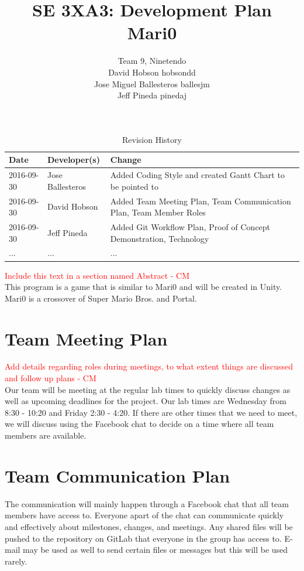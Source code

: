 \documentclass{article}
\title{SE 3XA3: Development Plan\\Mari0}
\author{Team 9, Ninetendo
		\\ David Hobson hobsondd
		\\ Jose Miguel Ballesteros ballesjm
		\\ Jeff Pineda pinedaj
}
\date{}
\begin{document}
\begin{table}[hp]
\caption{Revision History} \label{TblRevisionHistory}
\begin{tabularx}{\textwidth}{llX}
\toprule
\textbf{Date} & \textbf{Developer(s)} & \textbf{Change}\\
\midrule
2016-09-30 & Jose Ballesteros & Added Coding Style and created Gantt Chart to be pointed to\\
2016-09-30 & David Hobson & Added Team Meeting Plan, Team Communication Plan, Team Member Roles\\
2016-09-30 & Jeff Pineda & Added Git Workflow Plan, Proof of Concept Demonstration, Technology\\
... & ... & ...\\
\bottomrule
\end{tabularx}
\end{table}

\newpage

\maketitle

\textcolor{red}{ Include this text in a section named Abstract - CM} \\
This program is a game that is similar to Mari0 and will be created in Unity. Mari0 is a crossover of Super Mario Bros. and Portal.

\section{Team Meeting Plan}
\textcolor{red}{Add details regarding roles during meetings, to what extent things are discussed and follow up plans - CM} \\
Our team will be meeting at the regular lab times to quickly discuss changes as well as upcoming deadlines for the project. Our lab times are Wednesday from 8:30 - 10:20 and Friday 2:30 - 4:20. If there are other times that we need to meet, we will discuss using the Facebook chat to decide on a time where all team members are available. 

\section{Team Communication Plan}
The communication will mainly happen through a Facebook chat that all team members have access to. Everyone apart of the chat can communicate quickly and effectively about milestones, changes, and meetings. Any shared files will be pushed to the repository on GitLab that everyone in the group has access to. E-mail may be used as well to send certain files or messages but this will be used rarely. 
\end{document}
